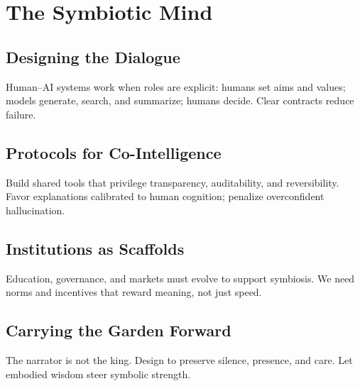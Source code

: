\chapter{The Symbiotic Mind}

\section{Designing the Dialogue}

Human–AI systems work when roles are explicit: humans set aims and values; models generate, search, and summarize; humans decide. Clear contracts reduce failure.

\section{Protocols for Co-Intelligence}

Build shared tools that privilege transparency, auditability, and reversibility. Favor explanations calibrated to human cognition; penalize overconfident hallucination.

\section{Institutions as Scaffolds}

Education, governance, and markets must evolve to support symbiosis. We need norms and incentives that reward meaning, not just speed.

\section{Carrying the Garden Forward}

The narrator is not the king. Design to preserve silence, presence, and care. Let embodied wisdom steer symbolic strength.
